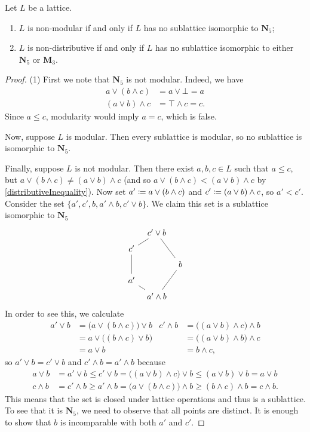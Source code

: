 \begin{theorem}
Let $L$ be a lattice.
\begin{enumerate}
\item $L$ is non-modular \textup{if and only if} $L$ has no sublattice isomorphic to $\mathbf{N}_5$;
\item $L$ is non-distributive \textup{if and only if} $L$ has no sublattice isomorphic to either $\mathbf{N}_5$ or $\mathbf{M}_3$.
\end{enumerate}
\end{theorem}
\begin{proof}
(1) First we note that $\mathbf{N}_5$ is not modular. Indeed, we have
\begin{align*}
a\vee (b\wedge c) &= a\vee \bot = a \\
(a\vee b) \wedge c &= \top \wedge c = c.
\end{align*}
Since $a\leq c$, modularity would imply $a = c$, which is false.

Now, suppose $L$ is modular. Then every sublattice is modular, so no sublattice is isomorphic to $\mathbf{N}_5$.

Finally, suppose $L$ is not modular. Then there exist $a,b,c\in L$ such that $a\leq c$, but $a\vee (b\wedge c) \neq (a\vee b)\wedge c$ (and so $a\vee (b\wedge c) < (a\vee b)\wedge c$ by \ref{distributiveInequality}). Now set $a' \coloneqq a\vee (b\wedge c)$ and $c'\coloneqq (a\vee b)\wedge c$, so $a'<c'$. Consider the set $\{a',c',b, a'\wedge b, c'\vee b\}$. We claim this set is a sublattice isomorphic to $\mathbf{N}_5$
\[ \begin{tikzcd}[row sep=tiny, column sep=tiny]
{} & \ar[dl, dash] \ar[ddr, dash] c'\vee b & {} \\
c' \ar[dd, dash] & {} & {} \\
{} & {} & b \ar[ddl, dash] \\
a' \ar[dr, dash] & {} & {} \\
{} & a'\wedge b & {} 
\end{tikzcd} \]
In order to see this, we calculate
\begin{align*}
a'\vee b &= \big(a\vee (b\wedge c)\big)\vee b & c'\wedge b &= \big((a\vee b)\wedge c\big)\wedge b \\
&= a\vee \big((b\wedge c)\vee b \big) &  &= \big((a\vee b)\wedge b\big)\wedge c \\
&= a\vee b &  &= b\wedge c,
\end{align*}
so $a'\vee b = c'\vee b$ and $c'\wedge b = a'\wedge b$ because
\begin{align*}
a\vee b &= a'\vee b \leq c'\vee b = \big((a\vee b)\wedge c\big)\vee b \leq (a\vee b)\vee b = a\vee b \\
c\wedge b &= c'\wedge b \geq a'\wedge b = \big(a\vee (b\wedge c)\big)\wedge b \geq (b\wedge c)\wedge b = c\wedge b.
\end{align*}
This means that the set is closed under lattice operations and thus is a sublattice. To see that it is $\mathbf{N}_5$, we need to observe that all points are distinct. It is enough to show that $b$ is incomparable with both $a'$ and $c'$.


\end{proof}
